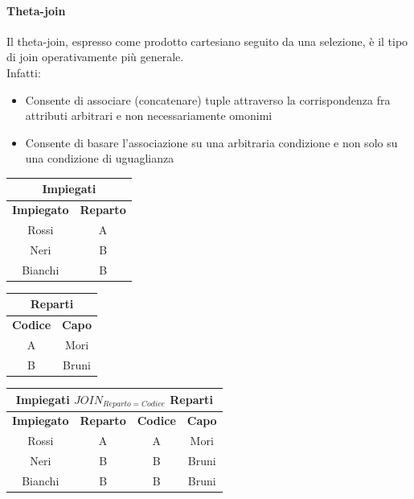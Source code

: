 \documentclass[../main.tex]{subfiles}
\begin{document}
	\paragraph{Theta-join}
	Il theta-join, espresso come prodotto cartesiano seguito da una selezione, è il tipo di join operativamente più generale.\\
	Infatti:
	\begin{itemize}
		\item Consente di associare (concatenare) tuple attraverso la corrispondenza fra attributi arbitrari e non necessariamente omonimi
		\item Consente di basare l’associazione su una arbitraria condizione e non solo su una condizione di uguaglianza
	\end{itemize}
	\begin{center}
		\begin{tabular}{ |c|c| }
			\hline
			\multicolumn{2}{|c|}{Impiegati}\\
			\hline
			\textbf{Impiegato} & \textbf{Reparto}\\
			\hline
			Rossi & A\\
			Neri & B\\
			Bianchi & B\\
			\hline
		\end{tabular}
		\begin{tabular}{ |c|c| }
			\hline
			\multicolumn{2}{|c|}{Reparti}\\
			\hline
			\textbf{Codice} & \textbf{Capo}\\
			\hline
			A & Mori \\
			B & Bruni \\
			\hline
		\end{tabular}
	\end{center}
	\begin{center}
		\begin{tabular}{ |c|c|c|c| }
			\hline
			\multicolumn{4}{|c|}{Impiegati $JOIN_{Reparto=Codice}$ Reparti}\\
			\hline
			\textbf{Impiegato} & \textbf{Reparto} & \textbf{Codice} & \textbf{Capo}\\
			\hline
			Rossi & A & A & Mori\\
			Neri & B & B & Bruni\\
			Bianchi & B & B & Bruni\\
			\hline
		\end{tabular}
	\end{center}
\end{document}
